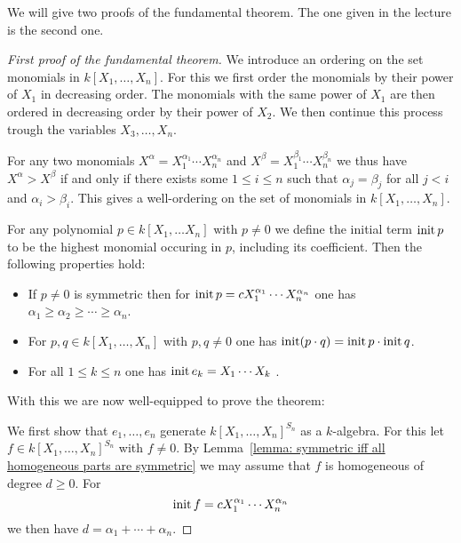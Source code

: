 \begin{fluff}
  We will give two proofs of the fundamental theorem.
  The one given in the lecture is the second one.
\end{fluff}


\begin{proof}[First proof of the fundamental theorem]
  \label{label: first proof of fundamental theorem}
  We introduce an ordering on the set monomials in $k[X_1, \dotsc, X_n]$.
  For this we first order the monomials by their power of $X_1$ in decreasing order.
  The monomials with the same power of $X_1$ are then ordered in decreasing order by their power of $X_2$.
  We then continue this process trough the variables $X_3, \dotsc, X_n$.
  
  For any two monomials $X^\alpha = X_1^{\alpha_1} \dotsm X_n^{\alpha_n}$ and $X^\beta = X_1^{\beta_1} \dotsm X_n^{\beta_n}$ we thus have $X^\alpha > X^\beta$ if and only if there exists some $1 \leq i \leq n$ such that $\alpha_j = \beta_j$ for all $j < i$ and $\alpha_i > \beta_i$.
  This gives a well-ordering on the set of monomials in $k[X_1, \dotsc, X_n]$.
  
  For any polynomial $p \in k[X_1, \dotsc X_n]$ with $p \neq 0$ we define the initial term $\operatorname{init} p$ to be the highest monomial occuring in $p$, including its coefficient.
  Then the following properties hold:
  \begin{itemize}
    \item
      If $p \neq 0$ is symmetric then for $\operatorname{init} p = c X_1^{\alpha_1} \dotsm X_n^{\alpha_n}$ one has $\alpha_1 \geq \alpha_2 \geq \dotsb \geq \alpha_n$.
    \item
      For $p, q \in k[X_1, \dotsc, X_n]$ with $p, q \neq 0$ one has $\operatorname{init} (p \cdot q) = \operatorname{init} p \cdot \operatorname{init} q$.
    \item
      For all $1 \leq k \leq n$ one has $\operatorname{init} e_k = X_1 \dotsm X_k$ .
  \end{itemize}
  With this we are now well-equipped to prove the theorem:
  
  We first show that $e_1, \dotsc, e_n$ generate $k[X_1, \dotsc, X_n]^{S_n}$ as a $k$-algebra.
  For this let $f \in k[X_1, \dotsc, X_n]^{S_n}$ with $f \neq 0$.
  By Lemma~\ref{lemma: symmetric iff all homogeneous parts are symmetric} we may assume that $f$ is homogeneous of degree $d \geq 0$.
  For
  \[
      \operatorname{init} f
    = c X_1^{\alpha_1} \dotsm X_n^{\alpha_n}
  \]
  we then have $d = \alpha_1 + \dotsb + \alpha_n$.
  

\end{proof}
